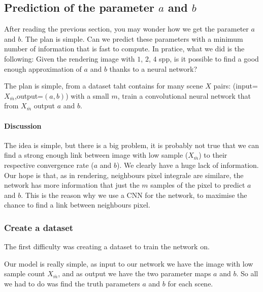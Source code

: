 \documentclass{classeENS}
\begin{document}
\subsection{Prediction of the parameter $a$ and $b$}

After reading the previous section, you may wonder how we get 
  the parameter $a$ and $b$. The plan is simple. Can we predict 
  these parameters with a minimum number of information that is 
  fast to compute. 
  In pratice, what we did is the following:
  Given the rendering image with $1$, $2$, $4$ 
  spp, is it possible to find a good enough approximation 
  of $a$ and $b$ thanks to a neural network?

\par The plan is simple, from a dataset taht contains for many scene $X$ pairs: 
(input=$X_{\bar m}$,output=$(a,b)$) with a small $m$, train a 
convolutional neural network that from $X_{\bar m}$ output $a$ and $b$.

\paragraph*{Discussion} The idea is simple, but there 
is a big problem, it is probably not true that we can find a 
strong enough link between image with low sample ($X_{\bar m}$) 
to their respective convergence rate ($a$ and $b$). We clearly have a 
huge lack of information. Our hope is that, as in rendering, neighbours 
pixel integrale are similare, the network has more information 
that just the $m$ samples of the pixel to predict $a$ and $b$. This 
is the reason why we use a CNN for the network, to maximise the chance
to find a link between neighbours pixel.

\subsubsection{Create a dataset}

\par The first difficulty was creating a dataset to train the network on. 

Our model is really simple, as input to our network we have 
the image with low sample count $X_{\bar m}$, and as output we have the 
two parameter maps $a$ and $b$. So all we had to do was find 
the truth parameters $a$ and $b$ for each scene.
\end{document}

